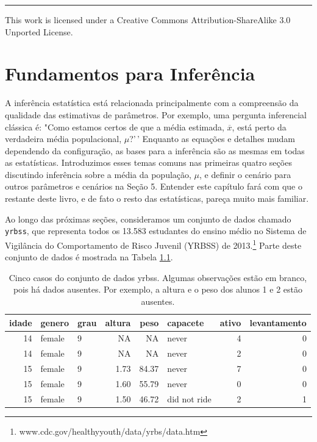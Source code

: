 \documentclass[
]{book}
\theoremstyle{definition}
\theoremstyle{definition}
\theoremstyle{definition}
\theoremstyle{definition}
\theoremstyle{remark}
\begin{document}
\begin{center}\rule{0.5\linewidth}{0.5pt}\end{center}

This work is licensed under a Creative Commons Attribution-ShareAlike 3.0 Unported License.

\hypertarget{ch4-fund-inf}{%
\chapter{Fundamentos para Inferência}\label{ch4-fund-inf}}

A inferência estatística está relacionada principalmente com a compreensão da qualidade das estimativas de parâmetros. Por exemplo, uma pergunta inferencial clássica é: "Como estamos certos de que a média estimada, \(\overline{x}\), está perto da verdadeira média populacional, \(\mu\)?'\,' Enquanto as equações e detalhes mudam dependendo da configuração, as bases para a inferência são as mesmas em todas as estatísticas. Introduzimos esses temas comuns nas primeiras quatro seções discutindo inferência sobre a média da população, \(\mu\), e definir o cenário para outros parâmetros e cenários na Seção 5. Entender este capítulo fará com que o restante deste livro, e de fato o resto das estatísticas, pareça muito mais familiar.

Ao longo das próximas seções, consideramos um conjunto de dados chamado \texttt{yrbss}, que representa todos os 13.583 estudantes do ensino médio no Sistema de Vigilância do Comportamento de Risco Juvenil (YRBSS) de 2013.\footnote{www.cdc.gov/healthyyouth/data/yrbs/data.htm} Parte deste conjunto de dados é mostrada na Tabela \ref{tab:yrbssDF}.

\begin{table}

\caption{\label{tab:yrbssDF}Cinco casos do conjunto de dados yrbss. Algumas observações estão em branco, pois há dados ausentes. Por exemplo, a altura e o peso dos alunos 1 e 2 estão ausentes.}
\centering
\begin{tabular}[t]{r|l|l|r|r|l|r|r}
\hline
idade & genero & grau & altura & peso & capacete & ativo & levantamento\\
\hline
14 & female & 9 & NA & NA & never & 4 & 0\\
\hline
14 & female & 9 & NA & NA & never & 2 & 0\\
\hline
15 & female & 9 & 1.73 & 84.37 & never & 7 & 0\\
\hline
15 & female & 9 & 1.60 & 55.79 & never & 0 & 0\\
\hline
15 & female & 9 & 1.50 & 46.72 & did not ride & 2 & 1\\
\hline
\end{tabular}
\end{table}
\end{document}
